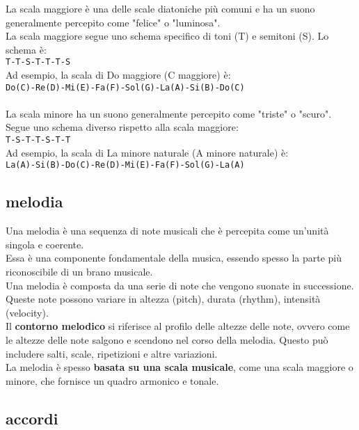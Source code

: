 \documentclass[a4paper,12pt]{report}
\begin{document}
La scala maggiore è una delle scale diatoniche più comuni e ha un suono generalmente percepito come "felice" o "luminosa". \\
La scala maggiore segue uno schema specifico di toni (T) e semitoni (S). Lo schema è: \\
\texttt{T-T-S-T-T-T-S} \\
Ad esempio, la scala di Do maggiore (C maggiore) è: \\
\texttt{Do(C)-Re(D)-Mi(E)-Fa(F)-Sol(G)-La(A)-Si(B)-Do(C)} \\
\\
La scala minore ha un suono generalmente percepito come "triste" o "scuro".  \\
Segue uno schema diverso rispetto alla scala maggiore: \\
\texttt{T-S-T-T-S-T-T} \\
Ad esempio, la scala di La minore naturale (A minore naturale) è: \\
\texttt{La(A)-Si(B)-Do(C)-Re(D)-Mi(E)-Fa(F)-Sol(G)-La(A)} \\

\subsection{melodia}

Una melodia è una sequenza di note musicali che è percepita come un'unità singola e coerente. \\
Essa è una componente fondamentale della musica, essendo spesso la parte più riconoscibile di un brano musicale. \\
Una melodia è composta da una serie di note che vengono suonate in successione. Queste note possono variare in altezza (pitch), durata (rhythm), intensità (velocity). \\
Il \textbf{contorno melodico} si riferisce al profilo delle altezze delle note, ovvero come le altezze delle note salgono e scendono nel corso della melodia. Questo può includere salti, scale, ripetizioni e altre variazioni. \\
La melodia è spesso \textbf{basata su una scala musicale}, come una scala maggiore o minore, che fornisce un quadro armonico e tonale. 

\subsection{accordi}
\end{document}
